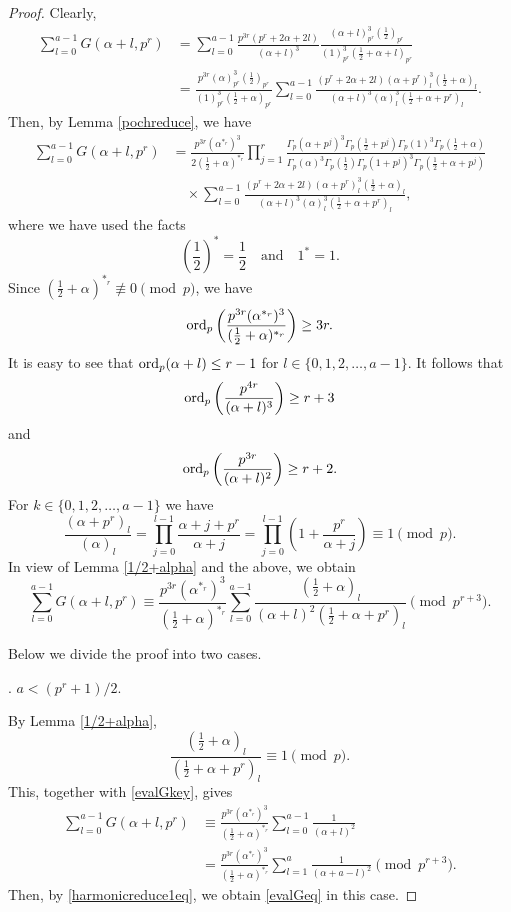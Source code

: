 \documentclass[12pt,reqno]{amsart}
\def\l{\left}
\def\r{\right}
\def\t{\text}
\def\f{\frac}
\def\ord{{\rm ord}}
\def\eq{\equiv}
\theoremstyle{plain}
\theoremstyle{definition}
\theoremstyle{remark}
\numberwithin{equation}{section}
\begin{document}
\begin{proof}
Clearly,
\begin{align*}
\sum_{l=0}^{a-1}G(\alpha+l,p^r)&=\sum_{l=0}^{a-1}\f{p^{3r}(p^r+2\alpha+2l)}{(\alpha+l)^3}\f{(\alpha+l)_{p^r}^3(\f12)_{p^r}}{(1)_{p^r}^3(\f12+\alpha+l)_{p^r}}\\
&=\f{p^{3r}(\alpha)_{p^r}^3(\f12)_{p^r}}{(1)_{p^r}^3(\f12+\alpha)_{p^r}}\sum_{l=0}^{a-1}\f{(p^r+2\alpha+2l)(\alpha+p^r)_l^3(\f12+\alpha)_l}{(\alpha+l)^3(\alpha)_l^3(\f12+\alpha+p^r)_l}.
\end{align*}
Then, by Lemma \ref{pochreduce}, we have
\begin{align*}
\sum_{l=0}^{a-1}G(\alpha+l,p^r)&=\f{p^{3r}(\alpha^{\ast_r})^3}{2(\f12+\alpha)^{\ast_r}}\prod_{j=1}^r\f{\Gamma_p(\alpha+p^j)^3\Gamma_p(\f12+p^j)\Gamma_p(1)^3\Gamma_p(\f12+\alpha)}{\Gamma_p(\alpha)^3\Gamma_p(\f12)\Gamma_p(1+p^j)^3\Gamma_p(\f12+\alpha+p^j)}\\
&\quad\times \sum_{l=0}^{a-1}\f{(p^r+2\alpha+2l)(\alpha+p^r)_l^3(\f12+\alpha)_l}{(\alpha+l)^3(\alpha)_l^3(\f12+\alpha+p^r)_l},
\end{align*}
where we have used the facts
$$
\l(\f12\r)^{\ast}=\f12\quad \t{and}\quad 1^{\ast}=1.
$$
Since $(\f12+\alpha)^{\ast_r}\not\eq0\pmod{p}$, we have
$$
\ord_p\l(\f{p^{3r}(\alpha^{\ast_r})^3}{(\f12+\alpha)^{\ast_r}}\r)\geq 3r.
$$
It is easy to see that $\ord_p(\alpha+l)\leq r-1$ for $l\in\{0,1,2,\ldots,a-1\}$. It follows that
$$
\ord_p\l(\f{p^{4r}}{(\alpha+l)^3}\r)\geq r+3
$$
and
$$
\ord_p\l(\f{p^{3r}}{(\alpha+l)^2}\r)\geq r+2.
$$
For $k\in\{0,1,2,\ldots,a-1\}$ we have
$$
\f{(\alpha+p^r)_l}{(\alpha)_l}=\prod_{j=0}^{l-1}\f{\alpha+j+p^r}{\alpha+j}=\prod_{j=0}^{l-1}\l(1+\f{p^r}{\alpha+j}\r)\eq1\pmod{p}.
$$
In view of Lemma \ref{1/2+alpha} and the above, we obtain
\begin{equation}\label{evalGkey}
\sum_{l=0}^{a-1}G(\alpha+l,p^r)\eq\f{p^{3r}(\alpha^{\ast_r})^3}{(\f12+\alpha)^{\ast_r}}\sum_{l=0}^{a-1}\f{(\f12+\alpha)_l}{(\alpha+l)^2(\f12+\alpha+p^r)_l}\pmod{p^{r+3}}.
\end{equation}


Below we divide the proof into two cases.

\medskip

. $a<(p^r+1)/2$.

\medskip

By Lemma \ref{1/2+alpha},
$$
\f{(\f12+\alpha)_l}{(\f12+\alpha+p^r)_l}\eq1\pmod{p}.
$$
This, together with \eqref{evalGkey}, gives
\begin{align*}
\sum_{l=0}^{a-1}G(\alpha+l,p^r)&\eq \f{p^{3r}(\alpha^{\ast_r})^3}{(\f12+\alpha)^{\ast_r}}\sum_{l=0}^{a-1}\f{1}{(\alpha+l)^2}\\
&=\f{p^{3r}(\alpha^{\ast_r})^3}{(\f12+\alpha)^{\ast_r}}\sum_{l=1}^{a}\f{1}{(\alpha+a-l)^2}\pmod{p^{r+3}}.
\end{align*}
Then, by \eqref{harmonicreduce1eq}, we obtain \eqref{evalGeq} in this case.


\end{proof}
\end{document}
